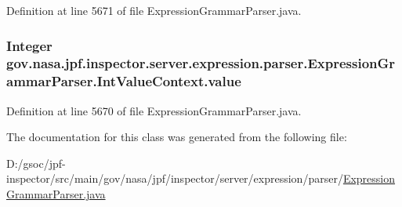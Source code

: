 Definition at line 5671 of file Expression\+Grammar\+Parser.\+java.

\subsubsection[{\texorpdfstring{value}{value}}]{\setlength{\rightskip}{0pt plus 5cm}Integer gov.\+nasa.\+jpf.\+inspector.\+server.\+expression.\+parser.\+Expression\+Grammar\+Parser.\+Int\+Value\+Context.\+value}\hypertarget{classgov_1_1nasa_1_1jpf_1_1inspector_1_1server_1_1expression_1_1parser_1_1_expression_grammar_parser_1_1_int_value_context_a4c7175811f1802632486ad762d032ad5}{}\label{classgov_1_1nasa_1_1jpf_1_1inspector_1_1server_1_1expression_1_1parser_1_1_expression_grammar_parser_1_1_int_value_context_a4c7175811f1802632486ad762d032ad5}


Definition at line 5670 of file Expression\+Grammar\+Parser.\+java.



The documentation for this class was generated from the following file\+:\begin{DoxyCompactItemize}
\item 
D\+:/gsoc/jpf-\/inspector/src/main/gov/nasa/jpf/inspector/server/expression/parser/\hyperlink{_expression_grammar_parser_8java}{Expression\+Grammar\+Parser.\+java}\end{DoxyCompactItemize}
